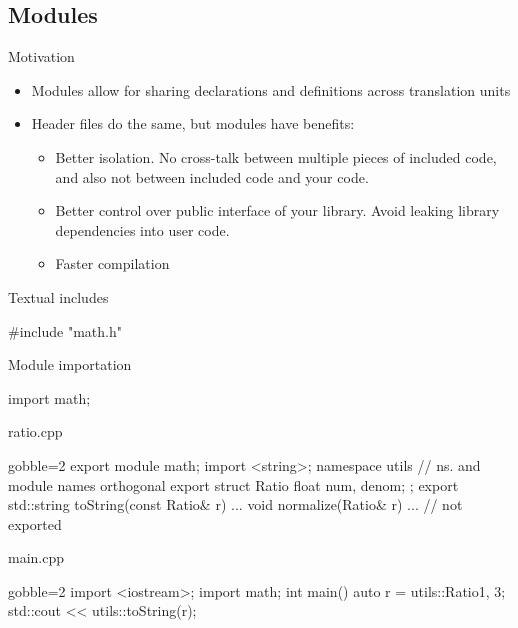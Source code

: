 \subsection[modules]{Modules}

\begin{frame}[fragile]
  \begin{block}{Motivation}
    \begin{itemize}
      \item Modules allow for sharing declarations and definitions across translation units
      \item Header files do the same, but modules have benefits:
      \begin{itemize}
        \item Better isolation. No cross-talk between multiple pieces of included code, and also not between included code and your code.
        \item Better control over public interface of your library. Avoid leaking library dependencies into user code.
        \item Faster compilation
      \end{itemize}
    \end{itemize}
  \end{block}
  \begin{alertblock}{Textual includes}
    \begin{cppcode}
      #include "math.h"
    \end{cppcode}
  \end{alertblock}
  \begin{exampleblock}{Module importation}
    \begin{cppcode}
      import math;
    \end{cppcode}
  \end{exampleblock}
\end{frame}

\begin{frame}[fragile]
  \begin{exampleblock}{ratio.cpp}
    \begin{cppcode*}{gobble=2}
      export module math;
      import <string>;
      namespace utils { // ns. and module names orthogonal
        export struct Ratio { float num, denom; };
        export std::string toString(const Ratio& r) { ... }
        void normalize(Ratio& r) { ... } // not exported
      }
    \end{cppcode*}
  \end{exampleblock}
  \begin{exampleblock}{main.cpp}
    \begin{cppcode*}{gobble=2}
      import <iostream>;
      import math;
      int main() {
        auto r = utils::Ratio{1, 3};
        std::cout << utils::toString(r);
      }
    \end{cppcode*}
  \end{exampleblock}
\end{frame}

